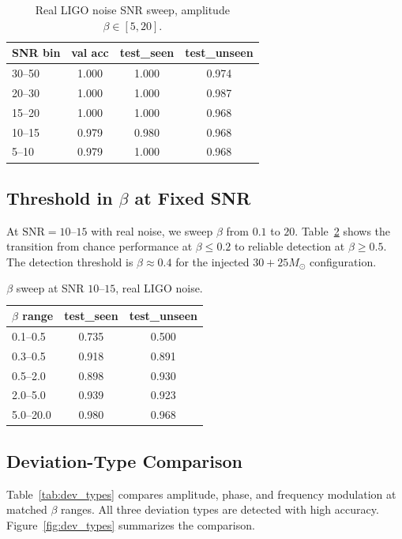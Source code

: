 \begin{table}[h]
\centering
\caption{Real LIGO noise SNR sweep, amplitude $\beta \in [5, 20]$.}
\label{tab:real_snr}
\begin{tabular}{lccc}
\toprule
SNR bin & val acc & test\_seen & test\_unseen \\
\midrule
30--50 & 1.000 & 1.000 & 0.974 \\
20--30 & 1.000 & 1.000 & 0.987 \\
15--20 & 1.000 & 1.000 & 0.968 \\
10--15 & 0.979 & 0.980 & 0.968 \\
5--10  & 0.979 & 1.000 & 0.968 \\
\bottomrule
\end{tabular}
\end{table}

\subsection{Threshold in $\beta$ at Fixed SNR}

At $\text{SNR} = 10$--$15$ with real noise, we sweep $\beta$ from
$0.1$ to $20$. Table~\ref{tab:beta_sweep} shows the transition from
chance performance at $\beta \leq 0.2$ to reliable detection at
$\beta \geq 0.5$. The detection threshold is $\beta \approx 0.4$ for
the injected $30 + 25 M_\odot$ configuration.

\begin{table}[h]
\centering
\caption{$\beta$ sweep at SNR $10$--$15$, real LIGO noise.}
\label{tab:beta_sweep}
\begin{tabular}{lcc}
\toprule
$\beta$ range & test\_seen & test\_unseen \\
\midrule
0.1--0.5  & 0.735 & 0.500 \\
0.3--0.5  & 0.918 & 0.891 \\
0.5--2.0  & 0.898 & 0.930 \\
2.0--5.0  & 0.939 & 0.923 \\
5.0--20.0 & 0.980 & 0.968 \\
\bottomrule
\end{tabular}
\end{table}

\subsection{Deviation-Type Comparison}

Table~\ref{tab:dev_types} compares amplitude, phase, and frequency
modulation at matched $\beta$ ranges. All three deviation types are
detected with high accuracy. Figure~\ref{fig:dev_types} summarizes
the comparison.

